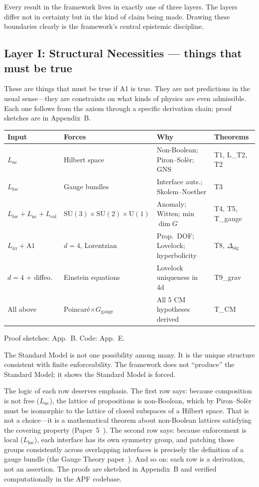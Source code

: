 \documentclass[11pt]{article}
\newcommand{\SU}{\mathrm{SU}}
\newcommand{\U}{\mathrm{U}}
\begin{document}
Every result in the framework lives in exactly one of three layers.  The layers differ not in certainty but in the kind of claim being made.  Drawing these boundaries clearly is the framework's central epistemic discipline.

\subsection{Layer I: Structural Necessities --- things that must be true}

These are things that must be true if A1 is true.  They are not predictions in the usual sense---they are constraints on what kinds of physics are even admissible.  Each one follows from the axiom through a specific derivation chain; proof sketches are in Appendix~B.

\smallskip
\begin{center}
\small
\begin{tabular}{p{3.2cm}p{3.5cm}p{4.2cm}p{2.5cm}}
\toprule
\textbf{Input} & \textbf{Forces} & \textbf{Why} & \textbf{Theorems} \\
\midrule
$L_{\mathrm{nc}}$ & Hilbert space & Non-Boolean; Piron--Sol\`er; GNS & T1, L\_T2, T2 \\
$L_{\mathrm{loc}}$ & Gauge bundles & Interface auts.; Skolem--Noether & T3 \\
$L_{\mathrm{loc}}+L_{\mathrm{nc}}+L_{\mathrm{col}}$ & $\SU(3)\!\times\!\SU(2)\!\times\!\U(1)$ & Anomaly; Witten; min$\dim G$ & T4, T5, T\_gauge \\
$L_{\mathrm{irr}} + \text{A1}$ & $d{=}4$, Lorentzian & Prop.\ DOF; Lovelock; hyperbolicity & T8, $\Delta_{\mathrm{sig}}$ \\
$d{=}4$ + diffeo. & Einstein equations & Lovelock uniqueness in 4d & T9\_grav \\
All above & Poincar\'e$\times G_{\mathrm{gauge}}$ & All 5 CM hypotheses derived & T\_CM \\
\bottomrule
\end{tabular}
\end{center}
\smallskip

\noindent Proof sketches: App.~B.  Code: App.~E.

The Standard Model is not one possibility among many.  It is the unique structure consistent with finite enforceability.  The framework does not ``produce'' the Standard Model; it shows the Standard Model is forced.

The logic of each row deserves emphasis.  The first row says: because composition is not free ($L_{\mathrm{nc}}$), the lattice of propositions is non-Boolean, which by Piron--Sol\`er must be isomorphic to the lattice of closed subspaces of a Hilbert space.  That is not a choice---it is a mathematical theorem about non-Boolean lattices satisfying the covering property (Paper~5~\cite{P5}).  The second row says: because enforcement is local ($L_{\mathrm{loc}}$), each interface has its own symmetry group, and patching those groups consistently across overlapping interfaces is precisely the definition of a gauge bundle (the Gauge Theory paper~\cite{PGT}).  And so on: each row is a derivation, not an assertion.  The proofs are sketched in Appendix~B and verified computationally in the APF codebase.
\end{document}
